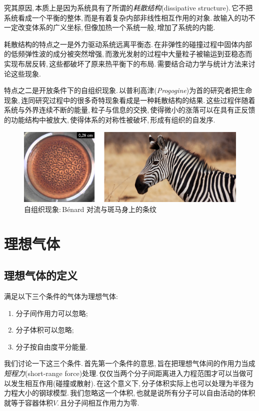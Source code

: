 究其原因,\,本质上是因为系统具有了所谓的\emph{耗散结构}(dissipative structure).\,它不把系统看成一个平衡的整体,\,而是有着复杂内部非线性相互作用的对象.\,故输入的功不一定改变体系的广义坐标,\,但像加热一个系统一般,\,增加了系统的内能.

耗散结构的特点之一是外力驱动系统远离平衡态.\,在非弹性的碰撞过程中固体内部的低频弹性波的成分被突然增强,\,而激光发射的过程中大量粒子被输运到亚稳态而实现布居反转,\,这些都破坏了原来热平衡下的布局.\,需要结合动力学与统计方法来讨论这些现象.

特点之二是开放条件下的自组织现象.\,以普利高津({\it Progogine})为首的研究者把生命现象,\,连同研究过程中的很多奇特现象看成是一种耗散结构的结果.\,这些过程伴随着系统与外界连续不断的能量,\,粒子与信息的交换,\,使得微小的涨落可以在具有正反馈的功能结构中被放大,\,使得体系的对称性被破坏,\,形成有组织的自发序.
\begin{figure}[H]
\centering
\includegraphics[width=14cm]{image/5-1-3.png}
\caption{自组织现象:\,B\'enard 对流与斑马身上的条纹}
\end{figure}


\npg{-10pt}

\section{理想气体}

\subsection{理想气体的定义}

满足以下三个条件的气体为理想气体:
\begin{enumerate}
	\item 分子间作用力可以忽略;
	\item 分子体积可以忽略;
	\item 分子按自由度平分能量.
\end{enumerate}

我们讨论一下这三个条件.\,首先第一个条件的意思,\,旨在把理想气体间的作用力当成\emph{短程力}(short-range force)处理.\,仅仅当两个分子间距离进入力程范围才可以当做可以发生相互作用(碰撞或散射).\,在这个意义下,\,分子体积实际上也可以处理为半径为力程大小的钢球模型.\,我们忽略这一个体积,\,也就是说所有分子可以自由活动的体积就等于容器体积$V$.\,且分子间相互作用力为零.

